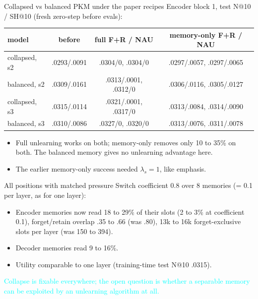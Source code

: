 \documentclass{beamer}
\newcommand{\pierre}[1]{\textcolor{cyan}{#1}}
\begin{document}
\begin{frame}{Collapsed vs balanced PKM under the paper recipes}
Encoder block 1, test N@10 / SH@10 (fresh zero-step before evals):
\begin{center}
\footnotesize\setlength{\tabcolsep}{3pt}
\begin{tabular}{|l|c|c|c|}
\hline
model & before & full F+R / NAU & memory-only F+R / NAU \\
\hline
collapsed, s2 & .0293/.0091 & .0304/0, .0304/0 & .0297/.0057, .0297/.0065 \\
balanced, s2  & .0309/.0161 & .0313/.0001, .0312/0 & .0306/.0116, .0305/.0127 \\
collapsed, s3 & .0315/.0114 & .0321/.0001, .0317/0 & .0313/.0084, .0314/.0090 \\
balanced, s3  & .0310/.0086 & .0327/0, .0320/0 & .0313/.0076, .0311/.0078 \\
\hline
\end{tabular}
\end{center}
\begin{itemize}
  \item Full unlearning works on both; memory-only removes only 10 to 35\% on
        both. The balanced memory gives no unlearning advantage here.
  \item The earlier memory-only success needed $\lambda_s = 1$, like emphasis.
\end{itemize}
\end{frame}

\begin{frame}{All positions with matched pressure}
Switch coefficient 0.8 over 8 memories (= 0.1 per layer, as for one layer):
\begin{itemize}
  \item Encoder memories now read 18 to 29\% of their slots (2 to 3\% at
        coefficient 0.1), forget/retain overlap .35 to .66 (was .80), 13k to 16k
        forget-exclusive slots per layer (was 150 to 394).
  \item Decoder memories read 9 to 16\%.
  \item Utility comparable to one layer (training-time test N@10 .0315).
\end{itemize}
\medskip
\pierre{Collapse is fixable everywhere; the open question is whether a
separable memory can be exploited by an unlearning algorithm at all.}
\end{frame}
\end{document}
